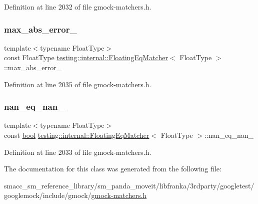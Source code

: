 Definition at line 2032 of file gmock-\/matchers.\+h.

\mbox{\label{classtesting_1_1internal_1_1FloatingEqMatcher_a06b3fd6f9ee60bc694a12ccaeba2924a}} 
\subsubsection{\texorpdfstring{max\+\_\+abs\+\_\+error\+\_\+}{max\_abs\_error\_}}
{\footnotesize\ttfamily template$<$typename Float\+Type$>$ \\
const Float\+Type \hyperlink{classtesting_1_1internal_1_1FloatingEqMatcher}{testing\+::internal\+::\+Floating\+Eq\+Matcher}$<$ Float\+Type $>$\+::max\+\_\+abs\+\_\+error\+\_\+\hspace{0.3cm}{\ttfamily [private]}}



Definition at line 2035 of file gmock-\/matchers.\+h.

\mbox{\label{classtesting_1_1internal_1_1FloatingEqMatcher_a782b06cb55b4989c3c67facf910265bf}} 
\subsubsection{\texorpdfstring{nan\+\_\+eq\+\_\+nan\+\_\+}{nan\_eq\_nan\_}}
{\footnotesize\ttfamily template$<$typename Float\+Type$>$ \\
const \hyperlink{classbool}{bool} \hyperlink{classtesting_1_1internal_1_1FloatingEqMatcher}{testing\+::internal\+::\+Floating\+Eq\+Matcher}$<$ Float\+Type $>$\+::nan\+\_\+eq\+\_\+nan\+\_\+\hspace{0.3cm}{\ttfamily [private]}}



Definition at line 2033 of file gmock-\/matchers.\+h.



The documentation for this class was generated from the following file\+:\begin{DoxyCompactItemize}
\item 
smacc\+\_\+sm\+\_\+reference\+\_\+library/sm\+\_\+panda\+\_\+moveit/libfranka/3rdparty/googletest/googlemock/include/gmock/\hyperlink{gmock-matchers_8h}{gmock-\/matchers.\+h}\end{DoxyCompactItemize}
